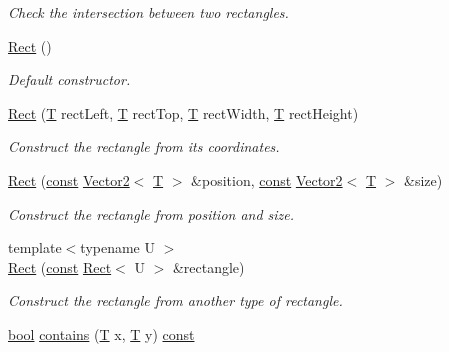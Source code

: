 \begin{DoxyCompactItemize}
\begin{DoxyCompactList}\small\item\em Check the intersection between two rectangles. \end{DoxyCompactList}\item 
\hyperlink{classsf_1_1_rect_a0f87ebaef9722a6222fd2e04ce8efb37}{Rect} ()
\begin{DoxyCompactList}\small\item\em Default constructor. \end{DoxyCompactList}\item 
\hyperlink{classsf_1_1_rect_a15cdbc5a1aed3a8fc7be1bd5004f19f9}{Rect} (\hyperlink{curses_8priv_8h_a5ef253115820acf7d27f3c5c3b02a0f0}{T} rect\-Left, \hyperlink{curses_8priv_8h_a5ef253115820acf7d27f3c5c3b02a0f0}{T} rect\-Top, \hyperlink{curses_8priv_8h_a5ef253115820acf7d27f3c5c3b02a0f0}{T} rect\-Width, \hyperlink{curses_8priv_8h_a5ef253115820acf7d27f3c5c3b02a0f0}{T} rect\-Height)
\begin{DoxyCompactList}\small\item\em Construct the rectangle from its coordinates. \end{DoxyCompactList}\item 
\hyperlink{classsf_1_1_rect_a27fdf85caa6d12caeeff78913cc59936}{Rect} (\hyperlink{term__entry_8h_a57bd63ce7f9a353488880e3de6692d5a}{const} \hyperlink{classsf_1_1_vector2}{Vector2}$<$ \hyperlink{curses_8priv_8h_a5ef253115820acf7d27f3c5c3b02a0f0}{T} $>$ \&position, \hyperlink{term__entry_8h_a57bd63ce7f9a353488880e3de6692d5a}{const} \hyperlink{classsf_1_1_vector2}{Vector2}$<$ \hyperlink{curses_8priv_8h_a5ef253115820acf7d27f3c5c3b02a0f0}{T} $>$ \&size)
\begin{DoxyCompactList}\small\item\em Construct the rectangle from position and size. \end{DoxyCompactList}\item 
{\footnotesize template$<$typename U $>$ }\\\hyperlink{classsf_1_1_rect_a6fff2bb7e93677839461a66bc2957de0}{Rect} (\hyperlink{term__entry_8h_a57bd63ce7f9a353488880e3de6692d5a}{const} \hyperlink{classsf_1_1_rect}{Rect}$<$ U $>$ \&rectangle)
\begin{DoxyCompactList}\small\item\em Construct the rectangle from another type of rectangle. \end{DoxyCompactList}\item 
\hyperlink{term__entry_8h_a002004ba5d663f149f6c38064926abac}{bool} \hyperlink{classsf_1_1_rect_aa8a5364c84de6dd5299f833b54e31ef1}{contains} (\hyperlink{curses_8priv_8h_a5ef253115820acf7d27f3c5c3b02a0f0}{T} x, \hyperlink{curses_8priv_8h_a5ef253115820acf7d27f3c5c3b02a0f0}{T} y) \hyperlink{term__entry_8h_a57bd63ce7f9a353488880e3de6692d5a}{const} 

\end{DoxyCompactItemize}
